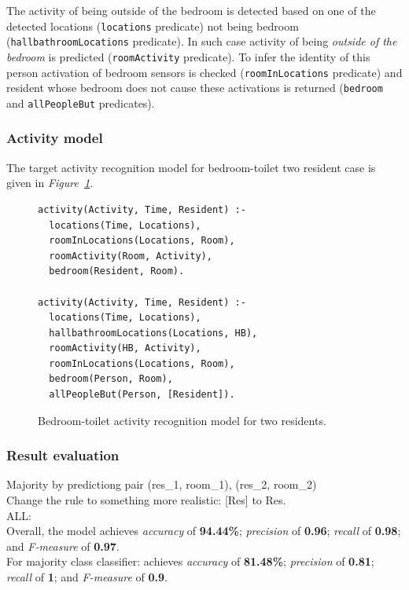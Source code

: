 \documentclass[10pt, a4paper, pdflatex, leqno, twoside, openright]{report}
\begin{document}
The activity of being outside of the bedroom is detected based on one of the detected locations (\texttt{locations} predicate) not being bedroom (\texttt{hallbathroomLocations} predicate). In such case activity of being \emph{outside of the bedroom} is predicted (\texttt{roomActivity} predicate). To infer the identity of this person activation of bedroom sensors is checked (\texttt{roomInLocations} predicate) and resident whose bedroom does not cause these activations is returned (\texttt{bedroom} and \texttt{allPeopleBut} predicates).

      \subsubsection{Activity model}
The target activity recognition model for bedroom-toilet two resident case is given in \emph{Figure~\ref{lst:BTtwo}}.\\

\begin{figure}[htb]
  \begin{verbatim}
activity(Activity, Time, Resident) :-
  locations(Time, Locations),
  roomInLocations(Locations, Room),
  roomActivity(Room, Activity),
  bedroom(Resident, Room).

activity(Activity, Time, Resident) :-
  locations(Time, Locations),
  hallbathroomLocations(Locations, HB),
  roomActivity(HB, Activity),
  roomInLocations(Locations, Room),
  bedroom(Person, Room),
  allPeopleBut(Person, [Resident]).
  \end{verbatim}
  \caption{Bedroom-toilet activity recognition model for two residents.\label{lst:BTtwo}}
\end{figure}

      \subsubsection{Result evaluation}
Majority by predictiong pair (res\_1, room\_1), (res\_2, room\_2)\\
Change the rule to something more realistic: [Res] to Res.\\

ALL:\\
Overall, the model achieves \emph{accuracy} of \textbf{94.44\%}; \emph{precision} of \textbf{0.96}; \emph{recall} of \textbf{0.98}; and \emph{F-measure} of \textbf{0.97}.\\
For majority class classifier: achieves \emph{accuracy} of \textbf{81.48\%}; \emph{precision} of \textbf{0.81}; \emph{recall} of \textbf{1}; and \emph{F-measure} of \textbf{0.9}.\\
\end{document}
